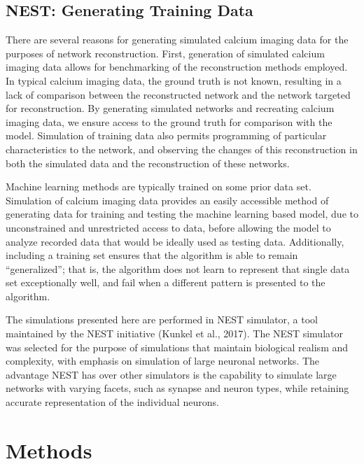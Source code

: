 \documentclass[11pt]{article}
\begin{document}
\subsection{NEST: Generating Training Data}
There are several reasons for generating simulated calcium imaging data for the purposes of network reconstruction. First, generation of simulated calcium imaging data allows for benchmarking of the reconstruction methods employed. In typical calcium imaging data, the ground truth is not known, resulting in a lack of comparison between the reconstructed network and the network targeted for reconstruction. By generating simulated networks and recreating calcium imaging data, we ensure access to the ground truth for comparison with the model. Simulation of training data also permits programming of particular characteristics to the network, and observing the changes of this reconstruction in both the simulated data and the reconstruction of these networks.\par
Machine learning methods are typically trained on some prior data set. Simulation of calcium imaging data provides an easily accessible method of generating data for training and testing the machine learning based model, due to unconstrained and unrestricted access to data, before allowing the model to analyze recorded data that would be ideally used as testing data. Additionally, including a training set ensures that the algorithm is able to remain “generalized”; that is, the algorithm does not learn to represent that single data set exceptionally well, and fail when a different pattern is presented to the algorithm.\par
The simulations presented here are performed in NEST simulator, a tool maintained by the NEST initiative (Kunkel et al., 2017). The NEST simulator was selected for the purpose of simulations that maintain biological realism and complexity, with emphasis on simulation of large neuronal networks. The advantage NEST has over other simulators is the capability to simulate large networks with varying facets, such as synapse and neuron types, while retaining accurate representation of the individual neurons.\par

\section{Methods}
\end{document}
